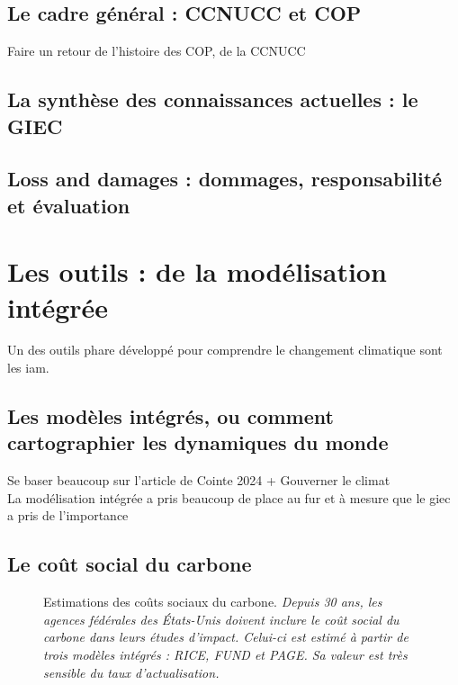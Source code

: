 \subsection{Le cadre général : CCNUCC et COP}
\label{sect:1.2.2}
Faire un retour de l'histoire des COP, de la CCNUCC 

\subsection{La synthèse des connaissances actuelles : le GIEC}
\label{sect:1.2.3}

\subsection{Loss and damages : dommages, responsabilité et évaluation}
\label{sect:1.2.4}

\section{Les outils : de la modélisation intégrée}
\label{sect:1.3}

Un des outils phare développé pour comprendre le changement climatique sont les \gls{iam}.

\subsection{Les modèles intégrés, ou comment cartographier les dynamiques du monde}
\label{sect:1.3.1}

Se baser beaucoup sur l'article de Cointe 2024 + Gouverner le climat \\

La modélisation intégrée a pris beaucoup de place au fur et à mesure que le giec a pris de l'importance

\subsection{Le coût social du carbone}
\label{sect:1.3.2}

\begin{figure}
    \centering
    \caption{Estimations des coûts sociaux du carbone. \textit{Depuis 30 ans, les agences fédérales des États-Unis doivent inclure le coût social du carbone dans leurs études d'impact. Celui-ci est estimé à partir de trois modèles intégrés : RICE, FUND et PAGE. Sa valeur est très sensible du taux d'actualisation.}}
    \label{fig:scc}
\end{figure}


